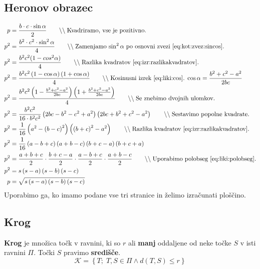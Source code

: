 \documentclass[a4paper,oneside,12pt,fleqn]{article}
\newcommand\krat\cdot
\newcommand{\comment}[1]{\ensuremath{\qquad\backslash\backslash\;}\textnormal{#1}}
\def\kos{\cos}
\numberwithin{equation}{section}
\begin{document}
\subsection{Heronov obrazec}
\label{sec:liki:heron}
\begin{align*}
  p &= \frac{b\krat c \krat \sin\alpha}{2} \comment{Kvadriramo, vse je pozitivno.} \\
  p^2 &= \frac{b^2\krat c^2\krat \sin^2\alpha}{4} \comment{Zamenjamo $\sin^2\alpha$ po osnovni
  zvezi~\eqref{eq:kot:zvez:sincos}.} \\
  p^2 &= \frac{b^2c^2(1-cos^2\alpha)}{4} \comment{Razlika
  kvadratov~\eqref{eq:izr:razlikakvadratov}.} \\
  p^2 &= \frac{b^2c^2\left( 1-\kos\alpha \right)\left( 1+\kos\alpha \right)}{4}
  \comment{Kosinusni izrek~\ref{eq:liki:cos}. $\kos\alpha=\frac{b^2+c^2-a^2}{2bc}$} \\
  p^2 &= \frac{b^2c^2\left( 1- \frac{b^2+c^2-a^2}{2bc}\right)\left( 1+
  \frac{b^2+c^2-a^2}{2bc}\right)}{4} \comment{Se znebimo dvojnih ulomkov.} \\
  p^2 &= \frac{b^2c^2}{16\krat b^2c^2}\left( 2bc-b^2-c^2+a^2 \right)\left( 2bc+b^2+c^2-a^2
  \right) \comment{Sestavimo popolne kvadrate.} \\
  p^2 &= \frac{1}{16}\left( a^2 - \left( b-c \right)^2 \right)\left( \left( b+c
  \right)^2 - a^2\right) \comment{Razlika kvadratov~\eqref{eq:izr:razlikakvadratov}.} \\
  p^2 &= \frac{1}{16}\left( a-b+c \right)\left( a+b-c \right)\left( b+c-a \right)\left(
  b+c+a \right) \\
  p^2 &= \frac{a+b+c}{2}\krat\frac{b+c-a}{2}\krat\frac{a-b+c}{2}\krat\frac{a+b-c}{2}
  \comment{Uporabimo polobseg~\eqref{eq:liki:polobseg}.} \\
  p^2 &= s\left( s-a \right)\left( s-b \right)\left( s-c \right) \\
  p &= \sqrt{s\left( s-a \right)\left( s-b \right)\left( s-c \right)}
\end{align*}
Uporabimo ga, ko imamo podane vse tri stranice in želimo izračunati ploščino.

\subsection{Krog}
\label{sec:liki:krog}
\textbf{Krog} je množica točk v ravnini, ki so $r$ ali \textbf{manj} oddaljene od neke točke $S$ v isti
ravnini $\Pi$. Točki $S$ pravimo \textbf{središče}.
\[ \mathcal{K} = \left\{ T; \; T,S \in \Pi \land d(T,S) \le r \right\} \]
\end{document}
